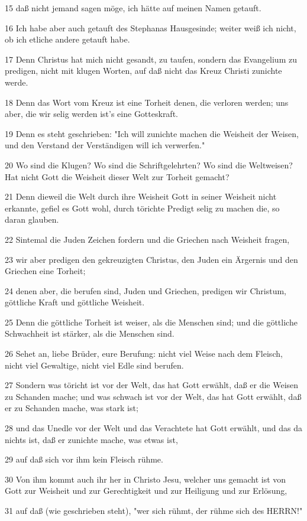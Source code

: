\par 15 daß nicht jemand sagen möge, ich hätte auf meinen Namen getauft.
\par 16 Ich habe aber auch getauft des Stephanas Hausgesinde; weiter weiß ich nicht, ob ich etliche andere getauft habe.
\par 17 Denn Christus hat mich nicht gesandt, zu taufen, sondern das Evangelium zu predigen, nicht mit klugen Worten, auf daß nicht das Kreuz Christi zunichte werde.
\par 18 Denn das Wort vom Kreuz ist eine Torheit denen, die verloren werden; uns aber, die wir selig werden ist's eine Gotteskraft.
\par 19 Denn es steht geschrieben: "Ich will zunichte machen die Weisheit der Weisen, und den Verstand der Verständigen will ich verwerfen."
\par 20 Wo sind die Klugen? Wo sind die Schriftgelehrten? Wo sind die Weltweisen? Hat nicht Gott die Weisheit dieser Welt zur Torheit gemacht?
\par 21 Denn dieweil die Welt durch ihre Weisheit Gott in seiner Weisheit nicht erkannte, gefiel es Gott wohl, durch törichte Predigt selig zu machen die, so daran glauben.
\par 22 Sintemal die Juden Zeichen fordern und die Griechen nach Weisheit fragen,
\par 23 wir aber predigen den gekreuzigten Christus, den Juden ein Ärgernis und den Griechen eine Torheit;
\par 24 denen aber, die berufen sind, Juden und Griechen, predigen wir Christum, göttliche Kraft und göttliche Weisheit.
\par 25 Denn die göttliche Torheit ist weiser, als die Menschen sind; und die göttliche Schwachheit ist stärker, als die Menschen sind.
\par 26 Sehet an, liebe Brüder, eure Berufung: nicht viel Weise nach dem Fleisch, nicht viel Gewaltige, nicht viel Edle sind berufen.
\par 27 Sondern was töricht ist vor der Welt, das hat Gott erwählt, daß er die Weisen zu Schanden mache; und was schwach ist vor der Welt, das hat Gott erwählt, daß er zu Schanden mache, was stark ist;
\par 28 und das Unedle vor der Welt und das Verachtete hat Gott erwählt, und das da nichts ist, daß er zunichte mache, was etwas ist,
\par 29 auf daß sich vor ihm kein Fleisch rühme.
\par 30 Von ihm kommt auch ihr her in Christo Jesu, welcher uns gemacht ist von Gott zur Weisheit und zur Gerechtigkeit und zur Heiligung und zur Erlösung,
\par 31 auf daß (wie geschrieben steht), "wer sich rühmt, der rühme sich des HERRN!"

